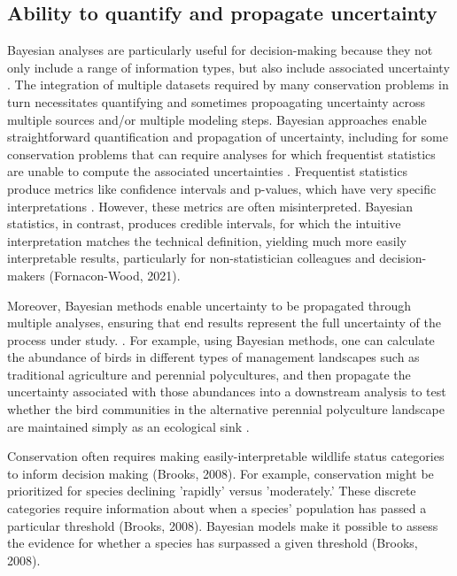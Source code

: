 \documentclass{article}
\begin{document}
\subsection*{Ability to quantify and propagate uncertainty} 
\par Bayesian analyses are particularly useful for decision-making because they not only include a range of information types, but also include associated uncertainty \citep{stern2022interweaving}. The integration of multiple datasets required by many conservation problems in turn necessitates quantifying and sometimes propoagating uncertainty across multiple sources and/or multiple modeling steps. Bayesian approaches enable straightforward quantification and  propagation of  uncertainty, including for some conservation problems that can require analyses for which frequentist statistics are unable to compute the associated uncertainties \citep{bolker2009a,bates2006r}. Frequentist statistics produce metrics like confidence intervals and p-values, which have very specific interpretations \citep{fornacon2021bayesian}. However, these metrics are often misinterpreted. Bayesian statistics, in contrast, produces credible intervals, for which the intuitive interpretation matches the technical definition, yielding much more easily interpretable results, particularly for non-statistician colleagues and decision-makers (Fornacon-Wood, 2021). 
\par Moreover, Bayesian methods enable uncertainty to be propagated through multiple analyses, ensuring that end results represent the full uncertainty of the process under study. \citep{draper1995assessment,gilbert2023propagating,Eyster2022,Saunders2019}. For example, using Bayesian methods, one can calculate the abundance of birds in different types of management landscapes such as traditional agriculture and perennial polycultures, and then propagate the uncertainty associated with those abundances into a downstream analysis to test whether the bird communities in the alternative perennial polyculture landscape are maintained simply as an ecological sink \citep{Eyster2022}. 


\par Conservation often requires making easily-interpretable wildlife status categories to inform decision making (Brooks, 2008). For example, conservation might be prioritized for species declining 'rapidly' versus 'moderately.' These discrete categories require information about when a species' population has passed a particular threshold (Brooks, 2008).  Bayesian models make it possible to assess the evidence for whether a species has surpassed a given threshold (Brooks, 2008). 
\end{document}
